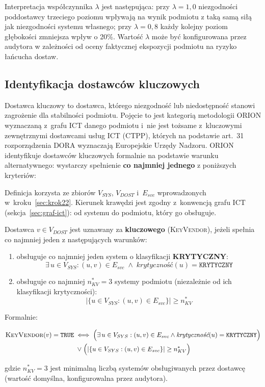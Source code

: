 Interpretacja współczynnika $\lambda$ jest następująca:
przy $\lambda = 1{,}0$ niezgodności poddostawcy
trzeciego poziomu wpływają na wynik podmiotu
z taką samą siłą jak niezgodności systemu własnego;
przy $\lambda = 0{,}8$ każdy kolejny poziom głębokości
zmniejsza wpływ o 20\%. Wartość $\lambda$ może być
konfigurowana przez audytora w zależności od
oceny faktycznej ekspozycji podmiotu na ryzyko
łańcucha dostaw.

\subsection{Identyfikacja dostawców kluczowych}
\label{sec:dostawcy-kluczowi}

Dostawca kluczowy to dostawca, którego niezgodność lub niedostępność stanowi zagrożenie dla stabilności podmiotu. Pojęcie to jest kategorią metodologii ORION wyznaczaną z~grafu ICT danego podmiotu i~nie jest tożsame z~kluczowymi zewnętrznymi dostawcami usług ICT (CTPP), których na podstawie art.~31 rozporządzenia DORA wyznaczają Europejskie Urzędy Nadzoru. ORION identyfikuje dostawców kluczowych formalnie na podstawie warunku alternatywnego: wystarczy spełnienie \textbf{co najmniej jednego} z poniższych kryteriów:

\noindent Definicja korzysta ze zbiorów $V_{SYS}$, $V_{DOST}$ i~$E_{svc}$ wprowadzonych w~kroku~\ref{sec:krok22}. Kierunek krawędzi jest zgodny z~konwencją grafu ICT
(sekcja~\ref{sec:graf-ict}): od systemu do podmiotu, który go obsługuje.

\begin{definition}
\label{def:dostawca-kluczowy}
Dostawca $v \in V_{DOST}$ jest uznawany za \textbf{kluczowego}
(\textsc{KeyVendor}), jeżeli spełnia co najmniej
jeden z następujących warunków:
\begin{enumerate}[label=(\roman*)]
  \item obsługuje co najmniej jeden system
        o klasyfikacji \textbf{KRYTYCZNY}:
        \[
          \exists\, u \in V_{SYS} :
          (u, v) \in E_{svc}
          \;\wedge\;
          \textit{krytyczność}(u) = \texttt{KRYTYCZNY}
        \]
  \item obsługuje co najmniej $n_{KV}^{*} = 3$
        systemy podmiotu (niezależnie od ich
        klasyfikacji krytyczności):
        \[
          \bigl|\{u \in V_{SYS} : (u,v) \in E_{svc}\}\bigr|
          \geq n_{KV}^{*}
        \]
\end{enumerate}
Formalnie:

\begin{multline}
\textsc{KeyVendor}(v) = \texttt{TRUE}
\iff
\Bigl(
  \exists\, u \in V_{SYS} :
  (u,v) \in E_{svc}
  \wedge
  \textit{krytyczność}(u) = \texttt{KRYTYCZNY}
\Bigr)
\\
\;\vee\;
\Bigl(
  |\{u \in V_{SYS} : (u,v) \in E_{svc}\}|
  \geq n_{KV}^{*}
\Bigr)
\label{eq:keyvendor}
\end{multline}

\noindent gdzie $n_{KV}^{*} = 3$
jest minimalną liczbą systemów obsługiwanych
przez dostawcę (wartość domyślna, konfigurowalna
przez audytora).
\end{definition}


